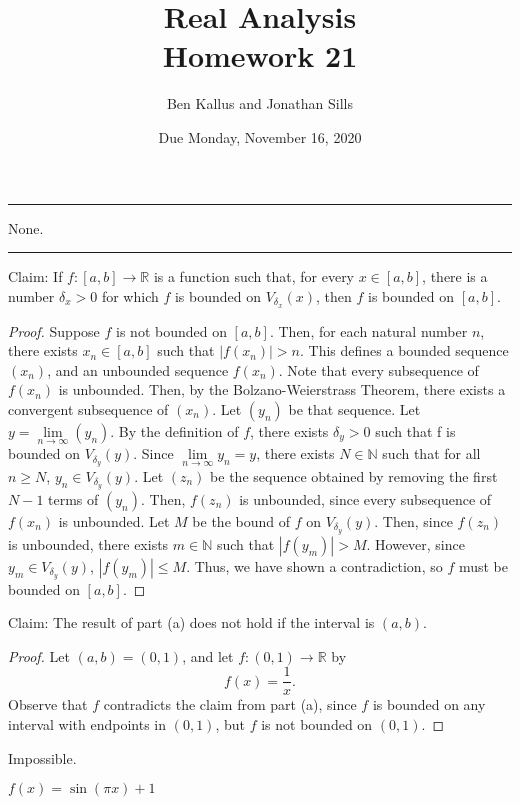 \documentclass[12pt]{article}
\title{Real Analysis \\ Homework 21}
\author{Ben Kallus and Jonathan Sills}
\date{Due Monday, November 16, 2020}
\begin{document}
\pagecolor{black}
\color{white}
\maketitle

\hrule
\bigskip

 None.

\bigskip
\hrule
\bigskip


\medskip
{} Claim: If $f: [a,b] \to \mathbb R$ is a function such that, for every $x \in [a,b]$, there is a number $\delta_x>0$ for which $f$ is bounded on $V_{\delta_x}(x)$, then $f$ is bounded on $[a,b]$.
\begin{proof}
    Suppose $f$ is not bounded on $[a,b]$.
    Then, for each natural number $n$, there exists $x_n \in [a,b]$ such that $|f(x_n)| > n$.
    This defines a bounded sequence $(x_n)$, and an unbounded sequence $f(x_n)$.
    Note that every subsequence of $f(x_n)$ is unbounded.
    Then, by the Bolzano-Weierstrass Theorem, there exists a convergent subsequence of $(x_n)$.
    Let $(y_n)$ be that sequence.
    Let $y = \lim\limits_{n \to \infty}(y_n)$.
    By the definition of $f$, there exists $\delta_y > 0$ such that f is bounded on $V_{\delta_y}(y)$.
    Since $\lim\limits_{n \to \infty} y_n = y$, there exists $N \in \mathbb N$ such that for all $n \geq N$, $y_n \in V_{\delta_y}(y)$.
    Let $(z_n)$ be the sequence obtained by removing the first $N-1$ terms of $(y_n)$.
    Then, $f(z_n)$ is unbounded, since every subsequence of $f(x_n)$ is unbounded.
    Let $M$ be the bound of $f$ on $V_{\delta_y}(y)$.
    Then, since $f(z_n)$ is unbounded, there exists $m \in \mathbb N$ such that $|f(y_m)| > M$.
    However, since $y_m \in V_{\delta_y}(y)$, $|f(y_m)| \leq M$.
    Thus, we have shown a contradiction, so $f$ must be bounded on $[a,b]$.
\end{proof}

\medskip
{} Claim: The result of part (a) does not hold if the interval is $(a,b)$.
\begin{proof}
    Let $(a, b) = (0, 1)$, and let $f: (0, 1) \to \mathbb R$ by \[f(x) = \frac1x.\]
    Observe that $f$ contradicts the claim from part (a), since $f$ is bounded on any interval with endpoints in $(0,1)$, but $f$ is not bounded on $(0,1)$.
\end{proof}

\newpage
{}

\medskip
{} Impossible. %

\medskip
{} $f(x) = \sin(\pi x) + 1$

\medskip
{} %

\medskip
{} %
\end{document}

